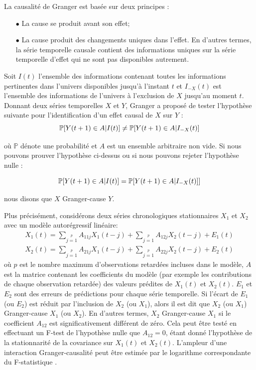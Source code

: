 La causalité de Granger est basée sur deux principes : 
\begin{itemize} 
\item[$\bullet$] La cause se produit avant son effet;
\item[$\bullet$] La cause produit des changements uniques dans l'effet. En d'autres termes, la série temporelle causale contient des informations uniques sur la série temporelle d'effet qui ne sont pas disponibles autrement.
\end{itemize} 
Soit $I(t)$ l'ensemble des informations contenant toutes les informations pertinentes dans l'univers disponibles jusqu'à l'instant $t$ et $I_{-X}(t)$ est l'ensemble des informations de l'univers à l'exclusion de $X$ jusqu'au moment $t$. Donnant deux séries temporelles $X$ et $Y$, Granger a proposé de tester l'hypothèse suivante pour l'identification d'un effet causal de $X$ sur $Y$ :
 $$ \mathbb{P}[Y(t + 1) \in A \arrowvert I(t)] \neq \mathbb{P}[Y(t + 1) \in A \arrowvert I_{-X}(t)] $$
 
où $\mathbb{P}$ dénote une probabilité et $A$ est un ensemble arbitraire non vide. Si nous pouvons prouver l'hypothèse ci-dessus ou si nous pouvons rejeter l'hypothèse nulle :

 $$  \mathbb{P} [Y(t + 1) \in A \arrowvert I(t)] = \mathbb {P} [Y (t + 1) \in A \arrowvert I_{-X} (t)] ]$$  
 
 nous disons que $X$ Granger-cause $Y$.
 
 Plus précisément, considérons deux séries chronologiques stationnaires $ X_1 $ et $ X_2 $ avec un modèle autorégressif linéaire:
\begin{equation}
\begin{array}{c}
 X_1(t) = \sum\limits_{j = 1}\limits^pA_{11j}X_1(t-j) + \sum\limits_{j = 1}\limits^pA_{12j}X_2(t-j) + E_1(t)\\
 X_2(t) = \sum\limits_{j = 1}\limits^pA_{21j}X_1(t-j) + \sum\limits_{j = 1}\limits^pA_{22j}X_2(t-j) + E_2(t)
\end{array}
\end{equation}
 où $p$ est le nombre maximum d'observations retardées incluses dans le modèle, $A$ est la matrice contenant les coefficients du modèle (par exemple les contributions de chaque observation retardée) des valeurs prédites de $X_1(t) $ et $X_2(t)$. $E_1$ et $E_2$ sont des erreurs de prédictions pour chaque série temporelle. Si l'écart de $E_1$ (ou $E_2$) est réduit par l'inclusion de $X_2$ (ou $X_1$), alors il est dit que $X_2$ (ou $X_1$) Granger-cause $X_1$ (ou $X_2$). En d'autres termes, $X_2$ Granger-cause $X_1$ si le coefficient $A_ {12}$ est significativement différent de zéro. Cela peut être testé en effectuant un F-test de l'hypothèse nulle que $A_{12} = 0$, étant donné l'hypothèse de la stationnarité de la covariance sur $X_1 (t)$ et $X_2(t)$. L'ampleur d'une interaction Granger-causalité peut être estimée par le logarithme correspondante du F-statistique \cite{geweke1982}.
 
